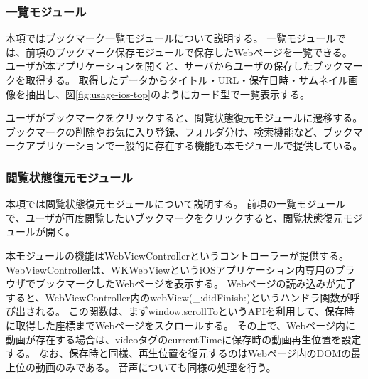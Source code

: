 \subsubsection{一覧モジュール}
本項ではブックマーク一覧モジュールについて説明する。
一覧モジュールでは、前項のブックマーク保存モジュールで保存したWebページを一覧できる。
ユーザが本アプリケーションを開くと、サーバからユーザの保存したブックマークを取得する。
取得したデータからタイトル・URL・保存日時・サムネイル画像を抽出し、図\ref{fig:usage-ios-top}のようにカード型で一覧表示する。

ユーザがブックマークをクリックすると、閲覧状態復元モジュールに遷移する。
ブックマークの削除やお気に入り登録、フォルダ分け、検索機能など、ブックマークアプリケーションで一般的に存在する機能も本モジュールで提供している。

\subsubsection{閲覧状態復元モジュール}
\label{sec:impl-client-ios-restore-module}

本項では閲覧状態復元モジュールについて説明する。
前項の一覧モジュールで、ユーザが再度閲覧したいブックマークをクリックすると、閲覧状態復元モジュールが開く。

本モジュールの機能はWebViewControllerというコントローラーが提供する。
WebViewControllerは、WKWebViewというiOSアプリケーション内専用のブラウザでブックマークしたWebページを表示する。
Webページの読み込みが完了すると、WebViewController内のwebView(\_:didFinish:)\cite{did-finish}というハンドラ関数が呼び出される。
この関数は、まずwindow.scrollToというAPIを利用して、保存時に取得した座標までWebページをスクロールする。
その上で、Webページ内に動画が存在する場合は、videoタグのcurrentTimeに保存時の動画再生位置を設定する。
なお、保存時と同様、再生位置を復元するのはWebページ内のDOMの最上位の動画のみである。
音声についても同様の処理を行う。
